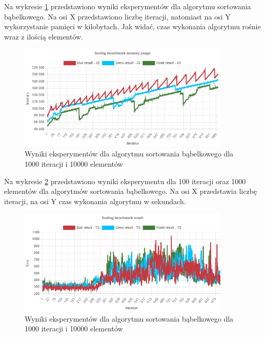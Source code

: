 Na wykresie \ref{fig:bubble_sorting_e6_memory_js} przedstawiono wyniki eksperymentów dla algorytmu sortowania bąbelkowego. Na osi X przedstawiono liczbę iteracji, natomiast na osi Y wykorzystanie pamięci w kilobytach. Jak widać, czas wykonania algorytmu rośnie wraz z ilością elementów.
\begin{figure}[H]
  \centering
  \includegraphics[width=0.9\textwidth]{Figures/sorting/bubble/e6_memory_js.png}
  \caption{Wyniki eksperymentów dla algorytmu sortowania bąbelkowego dla 1000 iteracji i 10000 elementów}
  \label{fig:bubble_sorting_e6_memory_js}
\end{figure}

Na wykresie \ref{fig:bubble_sorting_e6_ts} przedstawiono wyniki eksperymentu dla 100 iteracji oraz 1000 elementów dla algorytmów sortowania bąbelkowego. Na osi X przedstawia liczbę iteracji, na osi Y czas wykonania algorytmu w sekundach. 

\begin{figure}[H]
  \centering
  \includegraphics[width=0.9\textwidth]{Figures/sorting/bubble/e6_ts.png}
  \caption{Wyniki eksperymentów dla algorytmu sortowania bąbelkowego dla 1000 iteracji i 10000 elementów}
  \label{fig:bubble_sorting_e6_ts}
\end{figure}

